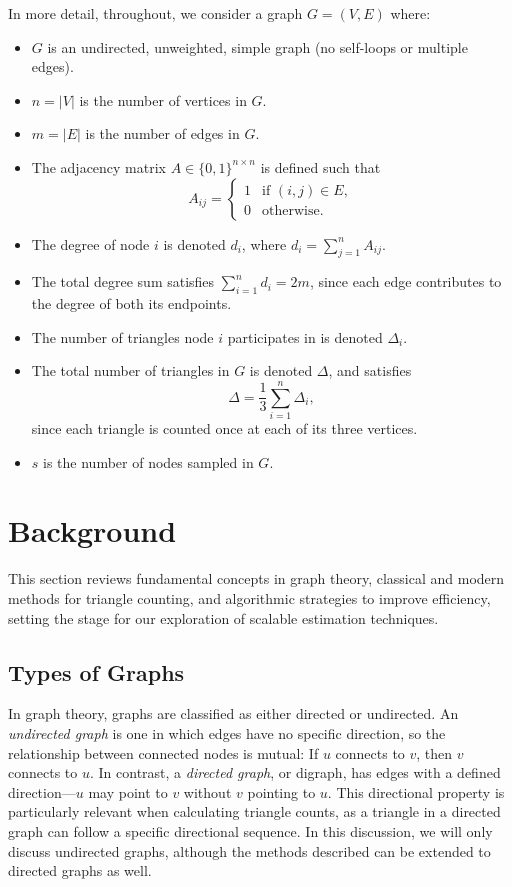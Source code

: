 \documentclass[11pt, margin=1in]{article}
\begin{document}
In more detail, throughout, we consider a graph \( G = (V, E) \) where:
\begin{itemize}
    \item \( G \) is an undirected, unweighted, simple graph (no self-loops or multiple edges).
    \item \( n = |V| \) is the number of vertices in \( G \).
    \item \( m = |E| \) is the number of edges in \( G \).
    \item The adjacency matrix \( A \in \{0,1\}^{n \times n} \) is defined such that
    \[
    A_{ij} =
    \begin{cases}
    1 & \text{if } (i,j) \in E, \\
    0 & \text{otherwise}.
    \end{cases}
    \]
    \item The degree of node \( i \) is denoted \( d_i \), where \( d_i = \sum_{j=1}^{n} A_{ij} \).
    \item The total degree sum satisfies \( \sum_{i=1}^{n} d_i = 2m \), since each edge contributes to the degree of both its endpoints.
    \item The number of triangles node \( i \) participates in is denoted \( \Delta_i \).
    \item The total number of triangles in \( G \) is denoted \( \Delta \), and satisfies
    \[
    \Delta = \frac{1}{3} \sum_{i=1}^{n} \Delta_i,
    \]
    since each triangle is counted once at each of its three vertices.
    \item $s$ is the number of nodes sampled in $G$.
\end{itemize}

\newpage

\section{Background}
\label{sec:background}

This section reviews fundamental concepts in graph theory, classical and modern methods for triangle counting, and algorithmic strategies to improve efficiency, setting the stage for our exploration of scalable estimation techniques.

\subsection{Types of Graphs}

In graph theory, graphs are classified as either directed or undirected.  
An \emph{undirected graph} is one in which edges have no specific direction, so the relationship between connected nodes is mutual: If $u$ connects to $v$, then $v$ connects to $u$.  
In contrast, a \emph{directed graph}, or digraph, has edges with a defined direction—$u$ may point to $v$ without $v$ pointing to $u$.  
This directional property is particularly relevant when calculating triangle counts, as a triangle in a directed graph can follow a specific directional sequence.  
In this discussion, we will only discuss undirected graphs, although the methods described can be extended to directed graphs as well.
\end{document}
